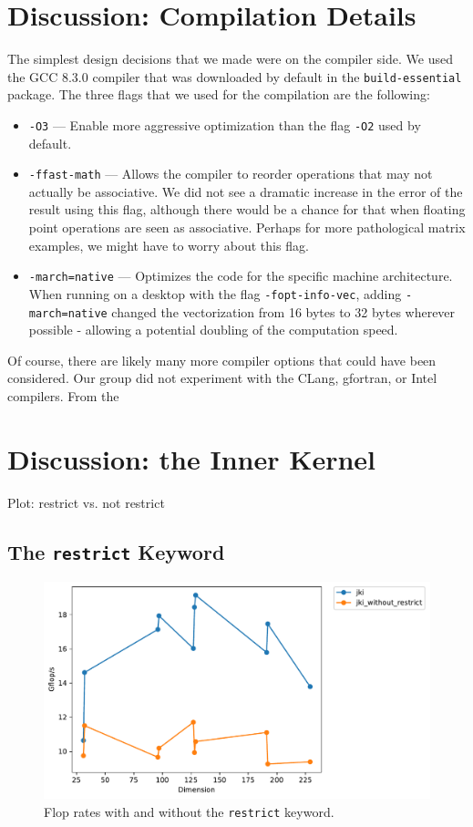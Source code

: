 \documentclass{article}
\begin{document}
\section{Discussion: Compilation Details}
The simplest design decisions that we made were on the compiler side. We used the GCC 8.3.0 compiler that was downloaded by default in the \texttt{build-essential} package. The three flags that we used for the compilation are the following:
\begin{itemize}
	\item \texttt{-O3} --- Enable more aggressive optimization than the flag \texttt{-O2} used by default. 
	\item \texttt{-ffast-math} --- Allows the compiler to reorder operations that may not actually be associative. We did not see a dramatic increase in the error of the result using this flag, although there would be a chance for that when floating point operations are seen as associative. Perhaps for more pathological matrix examples, we might have to worry about this flag.
	\item \texttt{-march=native} --- Optimizes the code for the specific machine architecture. When running on a desktop with the flag \texttt{-fopt-info-vec}, adding \texttt{-march=native} changed the vectorization from 16 bytes to 32 bytes wherever possible - allowing a potential doubling of the computation speed.
\end{itemize}

Of course, there are likely many more compiler options that could have been considered. Our group did not experiment with the CLang, gfortran, or Intel compilers. From the 


\section{Discussion: the Inner Kernel}
Plot: restrict vs. not restrict




\subsection{The \texttt{restrict} Keyword}
\begin{figure}
    \centering
    \includegraphics[width=0.8\columnwidth]{Restrict.pdf}
    \caption{Flop rates with and without the \texttt{restrict} keyword.}
    \label{fig:Restrict}
\end{figure}
\end{document}
